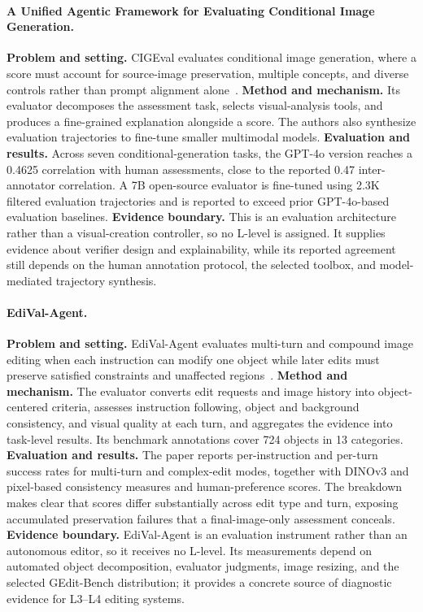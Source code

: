 \paragraph{A Unified Agentic Framework for Evaluating Conditional Image Generation.}
\textbf{Problem and setting.} CIGEval evaluates conditional image generation, where a score must account for source-image preservation, multiple concepts, and diverse controls rather than prompt alignment alone~\cite{avg250407046}. \textbf{Method and mechanism.} Its evaluator decomposes the assessment task, selects visual-analysis tools, and produces a fine-grained explanation alongside a score. The authors also synthesize evaluation trajectories to fine-tune smaller multimodal models. \textbf{Evaluation and results.} Across seven conditional-generation tasks, the GPT-4o version reaches a 0.4625 correlation with human assessments, close to the reported 0.47 inter-annotator correlation. A 7B open-source evaluator is fine-tuned using 2.3K filtered evaluation trajectories and is reported to exceed prior GPT-4o-based evaluation baselines. \textbf{Evidence boundary.} This is an evaluation architecture rather than a visual-creation controller, so no L-level is assigned. It supplies evidence about verifier design and explainability, while its reported agreement still depends on the human annotation protocol, the selected toolbox, and model-mediated trajectory synthesis.

\paragraph{EdiVal-Agent.}
\textbf{Problem and setting.} EdiVal-Agent evaluates multi-turn and compound image editing when each instruction can modify one object while later edits must preserve satisfied constraints and unaffected regions~\cite{avg250913399}. \textbf{Method and mechanism.} The evaluator converts edit requests and image history into object-centered criteria, assesses instruction following, object and background consistency, and visual quality at each turn, and aggregates the evidence into task-level results. Its benchmark annotations cover 724 objects in 13 categories. \textbf{Evaluation and results.} The paper reports per-instruction and per-turn success rates for multi-turn and complex-edit modes, together with DINOv3 and pixel-based consistency measures and human-preference scores. The breakdown makes clear that scores differ substantially across edit type and turn, exposing accumulated preservation failures that a final-image-only assessment conceals. \textbf{Evidence boundary.} EdiVal-Agent is an evaluation instrument rather than an autonomous editor, so it receives no L-level. Its measurements depend on automated object decomposition, evaluator judgments, image resizing, and the selected GEdit-Bench distribution; it provides a concrete source of diagnostic evidence for L3--L4 editing systems.

